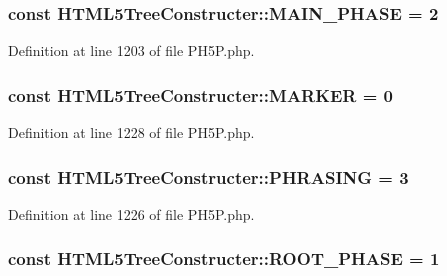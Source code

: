 \hypertarget{classHTML5TreeConstructer_ab47b9b28a03b9186cd5927e34a92ab00}{
\subsubsection[{M\+A\+I\+N\+\_\+\+P\+H\+A\+S\+E}]{\setlength{\rightskip}{0pt plus 5cm}const H\+T\+M\+L5\+Tree\+Constructer\+::\+M\+A\+I\+N\+\_\+\+P\+H\+A\+S\+E = 2}}\label{classHTML5TreeConstructer_ab47b9b28a03b9186cd5927e34a92ab00}


Definition at line 1203 of file P\+H5\+P.\+php.

\hypertarget{classHTML5TreeConstructer_a223a988344485fd8d6a7eb62da0bd6f2}{
\subsubsection[{M\+A\+R\+K\+E\+R}]{\setlength{\rightskip}{0pt plus 5cm}const H\+T\+M\+L5\+Tree\+Constructer\+::\+M\+A\+R\+K\+E\+R = 0}}\label{classHTML5TreeConstructer_a223a988344485fd8d6a7eb62da0bd6f2}


Definition at line 1228 of file P\+H5\+P.\+php.

\hypertarget{classHTML5TreeConstructer_a668f156805a33544101e8b616242bf35}{
\subsubsection[{P\+H\+R\+A\+S\+I\+N\+G}]{\setlength{\rightskip}{0pt plus 5cm}const H\+T\+M\+L5\+Tree\+Constructer\+::\+P\+H\+R\+A\+S\+I\+N\+G = 3}}\label{classHTML5TreeConstructer_a668f156805a33544101e8b616242bf35}


Definition at line 1226 of file P\+H5\+P.\+php.

\hypertarget{classHTML5TreeConstructer_ad5bb6803e6dd56fba50eea900c9796c8}{
\subsubsection[{R\+O\+O\+T\+\_\+\+P\+H\+A\+S\+E}]{\setlength{\rightskip}{0pt plus 5cm}const H\+T\+M\+L5\+Tree\+Constructer\+::\+R\+O\+O\+T\+\_\+\+P\+H\+A\+S\+E = 1}}\label{classHTML5TreeConstructer_ad5bb6803e6dd56fba50eea900c9796c8}


